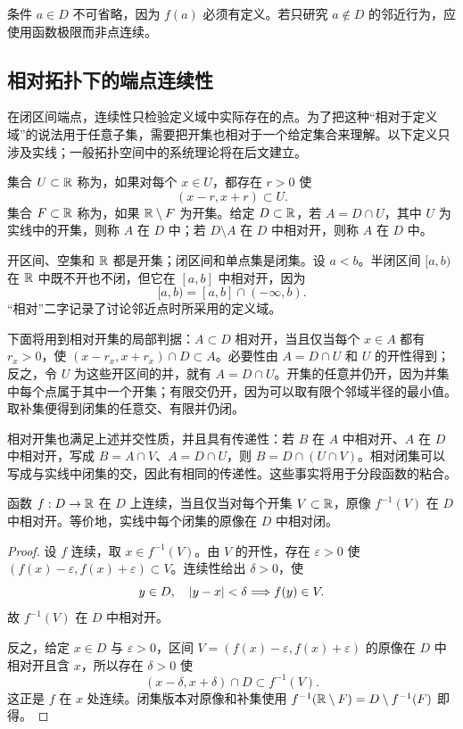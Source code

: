 条件 \(a\in D\) 不可省略，因为 \(f(a)\) 必须有定义。若只研究 \(a\notin D\) 的邻近行为，应使用函数极限而非点连续。

\subsection{相对拓扑下的端点连续性}

在闭区间端点，连续性只检验定义域中实际存在的点。为了把这种“相对于定义域”的说法用于任意子集，需要把开集也相对于一个给定集合来理解。以下定义只涉及实线；一般拓扑空间中的系统理论将在后文建立。

\begin{definition}[开集、闭集与相对开集]
集合 \(U\subset\mathbb{R}\) 称为，如果对每个 \(x\in U\)，都存在 \(r>0\) 使
\[
 (x-r,x+r)\subset U.
\]
集合 \(F\subset\mathbb{R}\) 称为，如果 \(\mathbb{R}\setminus F\) 为开集。给定 \(D\subset\mathbb{R}\)，若 \(A=D\cap U\)，其中 \(U\) 为实线中的开集，则称 \(A\) 在 \(D\) 中；若 \(D\setminus A\) 在 \(D\) 中相对开，则称 \(A\) 在 \(D\) 中。
\end{definition}

开区间、空集和 \(\mathbb{R}\) 都是开集；闭区间和单点集是闭集。设 \(a<b\)。半闭区间 \([a,b)\) 在 \(\mathbb{R}\) 中既不开也不闭，但它在 \([a,b]\) 中相对开，因为
\[
 [a,b)=[a,b]\cap(-\infty,b).
\]
“相对”二字记录了讨论邻近点时所采用的定义域。

下面将用到相对开集的局部判据：\(A\subset D\) 相对开，当且仅当每个 \(x\in A\) 都有 \(r_x>0\)，使
\((x-r_x,x+r_x)\cap D\subset A\)。必要性由 \(A=D\cap U\) 和 \(U\) 的开性得到；反之，令 \(U\) 为这些开区间的并，就有 \(A=D\cap U\)。开集的任意并仍开，因为并集中每个点属于其中一个开集；有限交仍开，因为可以取有限个邻域半径的最小值。取补集便得到闭集的任意交、有限并仍闭。

相对开集也满足上述并交性质，并且具有传递性：若 \(B\) 在 \(A\) 中相对开、\(A\) 在 \(D\) 中相对开，写成 \(B=A\cap V\)、\(A=D\cap U\)，则 \(B=D\cap(U\cap V)\)。相对闭集可以写成与实线中闭集的交，因此有相同的传递性。这些事实将用于分段函数的粘合。

\begin{theorem}[连续性的开集刻画]
函数 \(f:D\to\mathbb{R}\) 在 \(D\) 上连续，当且仅当对每个开集 \(V\subset\mathbb{R}\)，原像 \(f^{-1}(V)\) 在 \(D\) 中相对开。等价地，实线中每个闭集的原像在 \(D\) 中相对闭。
\end{theorem}

\begin{proof}
设 \(f\) 连续，取 \(x\in f^{-1}(V)\)。由 \(V\) 的开性，存在 \(\varepsilon>0\) 使
\((f(x)-\varepsilon,f(x)+\varepsilon)\subset V\)。连续性给出 \(\delta>0\)，使
\[
 y\in D,\quad \left|y-x\right|<\delta
 \Longrightarrow f(y)\in V.
\]
故 \(f^{-1}(V)\) 在 \(D\) 中相对开。

反之，给定 \(x\in D\) 与 \(\varepsilon>0\)，区间
\(V=(f(x)-\varepsilon,f(x)+\varepsilon)\) 的原像在 \(D\) 中相对开且含 \(x\)，所以存在 \(\delta>0\) 使
\[
 (x-\delta,x+\delta)\cap D\subset f^{-1}(V).
\]
这正是 \(f\) 在 \(x\) 处连续。闭集版本对原像和补集使用
\(f^{-1}(\mathbb{R}\setminus F)=D\setminus f^{-1}(F)\) 即得。
\end{proof}

